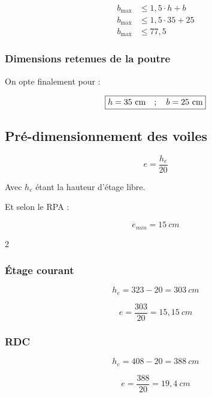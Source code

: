 \documentclass[12pt,a4paper]{article}
\begin{document}
	
	
	
	\[\begin{aligned}
		 b_{\max} &\leq 1,5 \cdot h + b \\
		 b_{\max} &\leq 1,5 \cdot 35 + 25 \\
		 b_{\max} &\leq 77,5
	\end{aligned}\]
	
	
	\subsubsection{Dimensions retenues de la poutre}
	
	On opte finalement pour :
	
	\[ \fbox{$h = 35~\unit{cm} \quad;\quad b = 25~\unit{cm}$} \]
	
	
	
	
	
	
	
	\subsection{Pré-dimensionnement des voiles}
	
	
	\[ e = \dfrac{h_{e}}{20} \]
	
	Avec $h_{e}$ étant la hauteur d'étage libre.
	
	
	\vspace{\baselineskip}
	
	Et selon le RPA : 
	
	\[ e_{min} = 15~\unit{cm} \]
	
	\vspace{\baselineskip}
	
	\begin{multicols}{2}
	
	\subsubsection{Étage courant}
	
	\[ h_{e} = 323 - 20 = 303~\unit{cm} \]
	
	\[ e = \dfrac{303}{20} = 15,15~\unit{cm} \]
	
	\columnbreak
	
	\subsubsection{RDC}
	
	\[ h_{e} = 408-20 = 388~\unit{cm} \]
	
	\[ e = \dfrac{388}{20} = 19,4~\unit{cm} \]

	
	\end{multicols}
	
\end{document}
